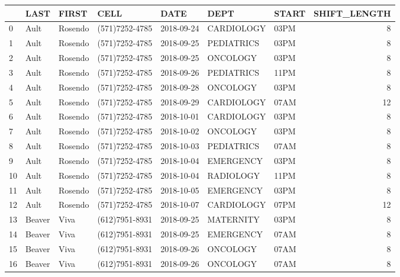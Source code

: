 \documentclass[11pt]{article}
\begin{document}
\begin{tabular}{|l|l|l|l|l|l|l|r|}
	\toprule
	{} &       LAST &    FIRST &            CELL &        DATE &            DEPT & START &  SHIFT\_LENGTH \\
	\midrule
	0  &       Ault &  Rosendo &  (571)7252-4785 &  2018-09-24 &      CARDIOLOGY &  03PM &             8 \\
	1  &       Ault &  Rosendo &  (571)7252-4785 &  2018-09-25 &      PEDIATRICS &  03PM &             8 \\
	2  &       Ault &  Rosendo &  (571)7252-4785 &  2018-09-25 &        ONCOLOGY &  03PM &             8 \\
	3  &       Ault &  Rosendo &  (571)7252-4785 &  2018-09-26 &      PEDIATRICS &  11PM &             8 \\
	4  &       Ault &  Rosendo &  (571)7252-4785 &  2018-09-28 &        ONCOLOGY &  03PM &             8 \\
	5  &       Ault &  Rosendo &  (571)7252-4785 &  2018-09-29 &      CARDIOLOGY &  07AM &            12 \\
	6  &       Ault &  Rosendo &  (571)7252-4785 &  2018-10-01 &      CARDIOLOGY &  03PM &             8 \\
	7  &       Ault &  Rosendo &  (571)7252-4785 &  2018-10-02 &        ONCOLOGY &  03PM &             8 \\
	8  &       Ault &  Rosendo &  (571)7252-4785 &  2018-10-03 &      PEDIATRICS &  07AM &             8 \\
	9  &       Ault &  Rosendo &  (571)7252-4785 &  2018-10-04 &       EMERGENCY &  03PM &             8 \\
	10 &       Ault &  Rosendo &  (571)7252-4785 &  2018-10-04 &       RADIOLOGY &  11PM &             8 \\
	11 &       Ault &  Rosendo &  (571)7252-4785 &  2018-10-05 &       EMERGENCY &  03PM &             8 \\
	12 &       Ault &  Rosendo &  (571)7252-4785 &  2018-10-07 &      CARDIOLOGY &  07PM &            12 \\
	13 &     Beaver &     Viva &  (612)7951-8931 &  2018-09-25 &       MATERNITY &  03PM &             8 \\
	14 &     Beaver &     Viva &  (612)7951-8931 &  2018-09-25 &       EMERGENCY &  07AM &             8 \\
	15 &     Beaver &     Viva &  (612)7951-8931 &  2018-09-26 &        ONCOLOGY &  07AM &             8 \\
	16 &     Beaver &     Viva &  (612)7951-8931 &  2018-09-26 &        ONCOLOGY &  07AM &             8 \\

\end{tabular}
\end{document}
